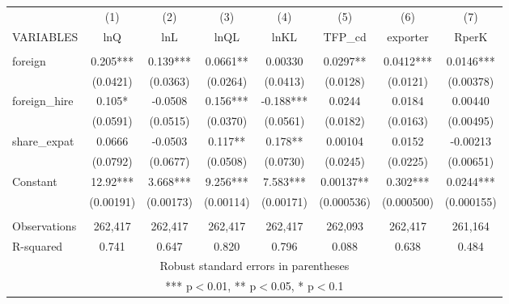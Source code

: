\documentclass[]{article}
\begin{document}
\begin{tabular}{lccccccc} \hline
 & (1) & (2) & (3) & (4) & (5) & (6) & (7) \\
VARIABLES & lnQ & lnL & lnQL & lnKL & TFP\_cd & exporter & RperK \\ \hline
 &  &  &  &  &  &  &  \\
foreign & 0.205*** & 0.139*** & 0.0661** & 0.00330 & 0.0297** & 0.0412*** & 0.0146*** \\
 & (0.0421) & (0.0363) & (0.0264) & (0.0413) & (0.0128) & (0.0121) & (0.00378) \\
foreign\_hire & 0.105* & -0.0508 & 0.156*** & -0.188*** & 0.0244 & 0.0184 & 0.00440 \\
 & (0.0591) & (0.0515) & (0.0370) & (0.0561) & (0.0182) & (0.0163) & (0.00495) \\
share\_expat & 0.0666 & -0.0503 & 0.117** & 0.178** & 0.00104 & 0.0152 & -0.00213 \\
 & (0.0792) & (0.0677) & (0.0508) & (0.0730) & (0.0245) & (0.0225) & (0.00651) \\
Constant & 12.92*** & 3.668*** & 9.256*** & 7.583*** & 0.00137** & 0.302*** & 0.0244*** \\
 & (0.00191) & (0.00173) & (0.00114) & (0.00171) & (0.000536) & (0.000500) & (0.000155) \\
 &  &  &  &  &  &  &  \\
Observations & 262,417 & 262,417 & 262,417 & 262,417 & 262,093 & 262,417 & 261,164 \\
 R-squared & 0.741 & 0.647 & 0.820 & 0.796 & 0.088 & 0.638 & 0.484 \\ \hline
\multicolumn{8}{c}{ Robust standard errors in parentheses} \\
\multicolumn{8}{c}{ *** p$<$0.01, ** p$<$0.05, * p$<$0.1} \\
\end{tabular}
\end{document}

